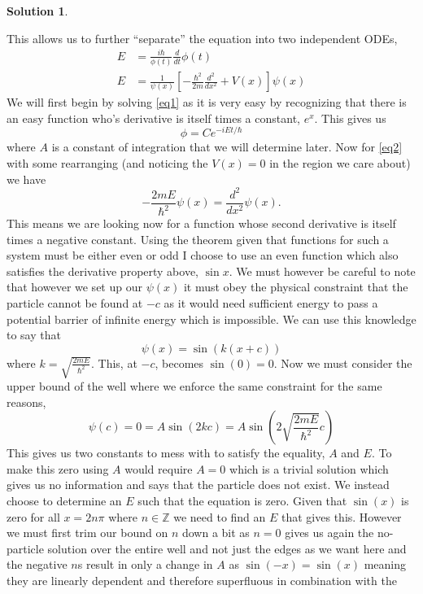 \documentclass[10pt]{article}
\theoremstyle{definition}
\newtheorem{soln}{Solution}
\begin{document}
\begin{soln}
\begin{enumerate}[label=(\alph*)]
          This allows us to further ``separate'' the equation into two independent ODEs,
          \begin{align}
            E & =\frac{i\hbar}{\phi(t)}\frac{d}{d t}\phi(t) \label{eq1}                                      \\
            E & =\frac{1}{\psi(x)}\left[-\frac{\hbar^2}{2m}\frac{d^2}{d x^2} + V(x)\right]\psi(x)\label{eq2}
          \end{align}
          We will first begin by solving \ref{eq1} as it is very easy by recognizing that there is an easy function who's derivative is itself times a constant, $e^x$.
          This gives us
          $$\phi=Ce^{-iEt/\hbar}$$
          where $A$ is a constant of integration that we will determine later.
          Now for \ref{eq2} with some rearranging (and noticing the $V(x)=0$ in the region we care about) we have
          $$-\frac{2mE}{\hbar^2}\psi(x)=\frac{d^2}{d x^2}\psi(x).$$
          This means we are looking now for a function whose second derivative is itself times a negative constant. 
          Using the theorem given that functions for such a system must be either even or odd I choose to use an even function which also satisfies the derivative
          property above, $\sin x$. We must however be careful to note that however we set up our $\psi(x)$ it must obey the physical constraint that
          the particle cannot be found at $-c$ as it would need sufficient energy to pass a potential barrier of infinite energy which is impossible. We can use this knowledge to say that
          $$\psi(x)=\sin\left(k(x+c)\right)$$
          where $k=\sqrt{\frac{2mE}{\hbar^2}}$. This, at $-c$, becomes $\sin (0)=0$. Now we must consider the upper bound of the well where we enforce the same constraint for the same reasons,
          $$ \psi(c) =0= A\sin\left(2kc\right)=A\sin\left(2\sqrt{\frac{2mE}{\hbar^2}}c\right) $$
          This gives us two constants to mess with to satisfy the equality, $A$ and $E$. To make this zero using $A$ would require $A=0$ which is a trivial solution which gives us no information
          and says that the particle does not exist. We instead choose to determine an $E$ such that the equation is zero. Given that $\sin(x)$ is zero for all
          $x=2n\pi$ where $n\in \mathbb{Z}$ we need to find an $E$ that gives this. However we must first trim our bound on $n$ down a bit as $n=0$ gives us
          again the no-particle solution over the entire well and not just the edges as we want here
          and the negative $n$s result in only a change in $A$ as $\sin(-x)=\sin(x)$ meaning they are linearly dependent and therefore superfluous in combination with the

\end{enumerate}
\end{soln}
\end{document}
